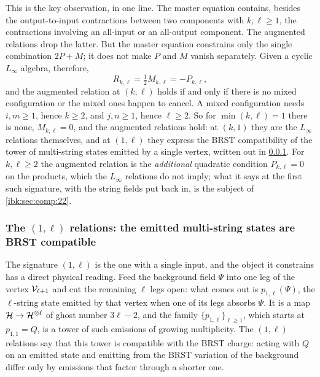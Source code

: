 This is the key observation, in one line. The master equation contains, besides the output-to-input contractions between two components with $k,\ell\ge1$, the contractions involving an all-input or an all-output component. The augmented relations drop the latter. But the master equation constrains only the single combination $2P+M$; it does not make $P$ and $M$ vanish separately. Given a cyclic $L_\infty$ algebra, therefore,
\begin{equation}
  \label{ibk:eq:comp:half-M}
  R_{k,\ell}
    = \tfrac12 M_{k,\ell}
    = -P_{k,\ell},
\end{equation}
and the augmented relation at $(k,\ell)$ holds if and only if there is no mixed configuration or the mixed ones happen to cancel. A mixed configuration needs $i,m\ge1$, hence $k\ge2$, and $j,n\ge1$, hence $\ell\ge2$. So for $\min(k,\ell)=1$ there is none, $M_{k,\ell}=0$, and the augmented relations hold: at $(k,1)$ they are the $L_\infty$ relations themselves, and at $(1,\ell)$ they express the BRST compatibility of the tower of multi-string states emitted by a single vertex, written out in \cref{ibk:sec:comp:1ell}. For $k,\ell\ge2$ the augmented relation is the \emph{additional} quadratic condition $P_{k,\ell}=0$ on the products, which the $L_\infty$ relations do not imply; what it says at the first such signature, with the string fields put back in, is the subject of \cref{ibk:sec:comp:22}.

\subsubsection{The \texorpdfstring{$(1,\ell)$}{(1,l)} relations: the emitted multi-string states are BRST compatible}
\label{ibk:sec:comp:1ell}

The signature $(1,\ell)$ is the one with a single input, and the object it constrains has a direct physical reading. Feed the background field $\Psi$ into one leg of the vertex ${\mathcal{V}}_{\ell+1}$ and cut the remaining $\ell$ legs open: what comes out is $p_{1,\ell}(\Psi)$, the $\ell$-string state emitted by that vertex when one of its legs absorbs $\Psi$. It is a map ${\mathcal{H}}\to{\mathcal{H}}^{\otimes\ell}$ of ghost number $3\ell-2$, and the family $\{p_{1,\ell}\}_{\ell\ge1}$, which starts at $p_{1,1}=Q$, is a tower of such emissions of growing multiplicity. The $(1,\ell)$ relations say that this tower is compatible with the BRST charge: acting with $Q$ on an emitted state and emitting from the BRST variation of the background differ only by emissions that factor through a shorter one.

